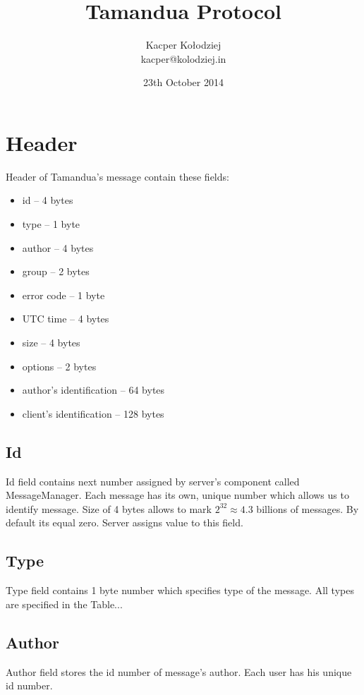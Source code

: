 \documentclass[11pt]{article}
\title{Tamandua Protocol}
\author{Kacper Kołodziej\\ kacper@kolodziej.in}
\date{23th October 2014}
\begin{document}
\maketitle
\makeindex

\section{Header}

Header of Tamandua's message contain these fields:
\begin{itemize}
	\item id -- 4 bytes
	\item type -- 1 byte
	\item author -- 4 bytes
	\item group -- 2 bytes
	\item error code -- 1 byte
	\item UTC time -- 4 bytes
	\item size -- 4 bytes
	\item options -- 2 bytes
	\item author's identification -- 64 bytes
	\item client's identification -- 128 bytes
\end{itemize}

\subsection{Id}

Id field contains next number assigned by server's component called MessageManager. Each message has its own, unique number which allows us to identify message. Size of 4 bytes allows to mark $2^{32} \approx 4.3$ billions of messages. By default its equal zero. Server assigns value to this field.

\subsection{Type}

Type field contains 1 byte number which specifies type of the message. All types are specified in the Table...

\subsection{Author}

Author field stores the id number of message's author. Each user has his unique id number.
\end{document}
